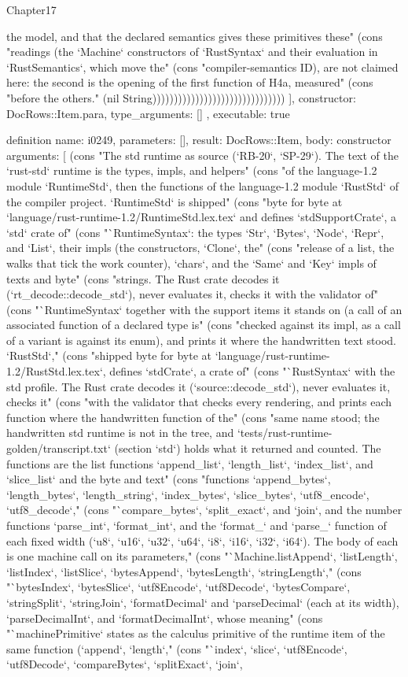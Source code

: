 \begin{lexlean}{Chapter17}
\begin{semanticmodule}
{{the model, and that the declared semantics gives these primitives these" (cons "readings (the `Machine` constructors of `RustSyntax` and their evaluation in `RustSemantics`, which move the" (cons "compiler-semantics ID), are not claimed here: the second is the opening of the first function of H4a, measured" (cons "before the others." (nil String)))))))))))))))))))))))))))))))
    ],
    constructor: DocRows::Item.para,
    type_arguments: []
  },
  executable: true
}

definition{
  name: i0249,
  parameters: [],
  result: DocRows::Item,
  body: constructor{
    arguments: [
      (cons "The std runtime as source (`RB-20`, `SP-29`). The text of the `rust-std` runtime is the types, impls, and helpers" (cons "of the language-1.2 module `RuntimeStd`, then the functions of the language-1.2 module `RustStd` of the compiler project. `RuntimeStd` is shipped" (cons "byte for byte at `language/rust-runtime-1.2/RuntimeStd.lex.tex` and defines `stdSupportCrate`, a `std` crate of" (cons "`RuntimeSyntax`: the types `Str`, `Bytes`, `Node`, `Repr`, and `List`, their impls (the constructors, `Clone`, the" (cons "release of a list, the walks that tick the work counter), `chars`, and the `Same` and `Key` impls of texts and byte" (cons "strings. The Rust crate decodes it (`rt_decode::decode_std`), never evaluates it, checks it with the validator of" (cons "`RuntimeSyntax` together with the support items it stands on (a call of an associated function of a declared type is" (cons "checked against its impl, as a call of a variant is against its enum), and prints it where the handwritten text stood. `RustStd`," (cons "shipped byte for byte at `language/rust-runtime-1.2/RustStd.lex.tex`, defines `stdCrate`, a crate of" (cons "`RustSyntax` with the std profile. The Rust crate decodes it (`source::decode_std`), never evaluates it, checks it" (cons "with the validator that checks every rendering, and prints each function where the handwritten function of the" (cons "same name stood; the handwritten std runtime is not in the tree, and `tests/rust-runtime-golden/transcript.txt` (section `std`) holds what it returned and counted. The functions are the list functions `append_list`, `length_list`, `index_list`, and `slice_list` and the byte and text" (cons "functions `append_bytes`, `length_bytes`, `length_string`, `index_bytes`, `slice_bytes`, `utf8_encode`, `utf8_decode`," (cons "`compare_bytes`, `split_exact`, and `join`, and the number functions `parse_int`, `format_int`, and the `format_` and `parse_` function of each fixed width (`u8`, `u16`, `u32`, `u64`, `i8`, `i16`, `i32`, `i64`). The body of each is one machine call on its parameters," (cons "`Machine.listAppend`, `listLength`, `listIndex`, `listSlice`, `bytesAppend`, `bytesLength`, `stringLength`," (cons "`bytesIndex`, `bytesSlice`, `utf8Encode`, `utf8Decode`, `bytesCompare`, `stringSplit`, `stringJoin`, `formatDecimal` and `parseDecimal` (each at its width), `parseDecimalInt`, and `formatDecimalInt`, whose meaning" (cons "`machinePrimitive` states as the calculus primitive of the runtime item of the same function (`append`, `length`," (cons "`index`, `slice`, `utf8Encode`, `utf8Decode`, `compareBytes`, `splitExact`, `join`, }}
\end{semanticmodule}
\end{lexlean}
